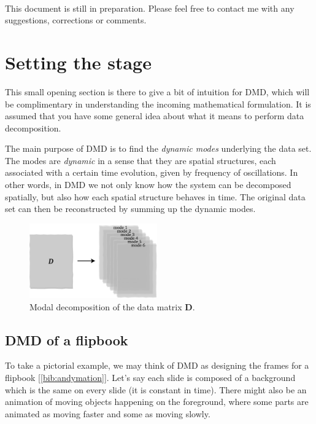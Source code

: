 \documentclass[10pt,twocolumn]{article}
\begin{document}
\,\,

This document is still in preparation. Please feel free to contact me with any suggestions, corrections or comments.

\tableofcontents


\vspace{10mm}

\section{Setting the stage}

This small opening section is there to give a bit of intuition for DMD, which will be complimentary in understanding the incoming mathematical formulation. It is assumed that you have some general idea about what it means to perform data decomposition.

The main purpose of DMD is to find the \textit{dynamic modes} underlying the data set. The modes are \textit{dynamic} in a sense that they are spatial structures, each associated with a certain time evolution, given by frequency of oscillations. In other words, in DMD we not only know how the system can be decomposed spatially, but also how each spatial structure behaves in time. The original data set can then be reconstructed by summing up the dynamic modes. 

\begin{figure}[H]
\centering\includegraphics[width=5.5cm]{DMD-modal-decomposition.png}
\caption{Modal decomposition of the data matrix $\bm{D}$.}
\label{fig:modal-decomposition}
\end{figure}

\subsection{DMD of a flipbook}

To take a pictorial example, we may think of DMD as designing the frames for a flipbook [\ref{bib:andymation}]. Let's say each slide is composed of a background which is the same on every slide (it is constant in time). There might also be an animation of moving objects happening on the foreground, where some parts are animated as moving faster and some as moving slowly.
\end{document}
